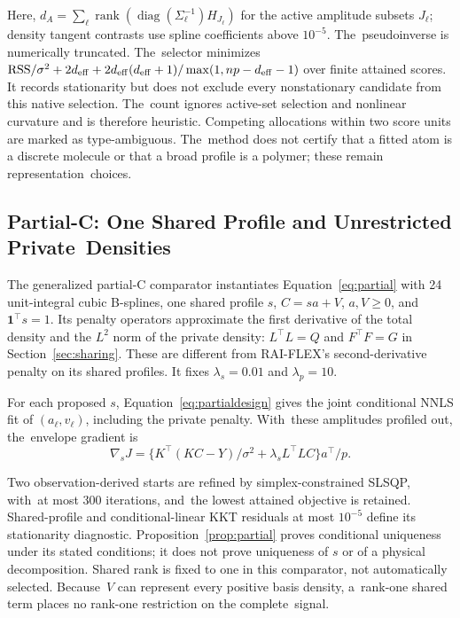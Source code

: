 \documentclass[mathematics,article,accept,moreauthors]{Definitions/mdpi}
\newcommand{\one}{\mathbf{1}}
\newcommand{\rank}{\operatorname{rank}}
\newcommand{\diag}{\operatorname{diag}}
\begin{document}
Here, $d_A=\sum_\ell\rank(\diag(\Sigma_\ell^{-1})H_{J_\ell})$ for the active amplitude subsets $J_\ell$; density tangent contrasts use spline coefficients above $10^{-5}$. The~pseudoinverse is numerically truncated. The~selector minimizes $\mathrm{RSS}/\sigma^2+2d_{\rm eff}+2d_{\rm eff}(d_{\rm eff}+1)/\max(1,np-d_{\rm eff}-1)$ over finite attained scores. It records stationarity but does not exclude every nonstationary candidate from this native selection. The~count ignores active-set selection and nonlinear curvature and is therefore heuristic. Competing allocations within two score units are marked as type-ambiguous. The~method does not certify that a fitted atom is a discrete molecule or that a broad profile is a polymer; these remain representation~choices.

\subsection{Partial-C: One Shared Profile and Unrestricted Private~Densities}\label{app:partialalgorithm}
The generalized partial-C comparator instantiates Equation~\eqref{eq:partial} with 24 unit-integral cubic B-splines, one shared profile $s$, $C=sa+V$, $a,V\geq0$, and~$\one^\top s=1$. Its penalty operators approximate the first derivative of the total density and the $L^2$ norm of the private density: $L^\top L=Q$ and $F^\top F=G$ in Section~\ref{sec:sharing}. These are different from RAI-FLEX's second-derivative penalty on its shared profiles. It fixes $\lambda_s=0.01$ and $\lambda_p=10$.

For each proposed $s$, Equation~\eqref{eq:partialdesign} gives the joint conditional NNLS fit of $(a_\ell,v_\ell)$, including the private penalty. With~these amplitudes profiled out, the~envelope gradient is
\begin{equation}\label{eq:partialgradient}
 \nabla_s J=\{K^\top(KC-Y)/\sigma^2+\lambda_sL^\top LC\}a^\top/p.
\end{equation}

Two observation-derived starts are refined by simplex-constrained SLSQP, with~at most 300 iterations, and~the lowest attained objective is retained. Shared-profile and conditional-linear KKT residuals at most $10^{-5}$ define its stationarity diagnostic. Proposition~\ref{prop:partial} proves conditional uniqueness under its stated conditions; it does not prove uniqueness of $s$ or of a physical decomposition. Shared rank is fixed to one in this comparator, not automatically selected. Because~$V$ can represent every positive basis density, a~rank-one shared term places no rank-one restriction on the complete~signal.
\end{document}
